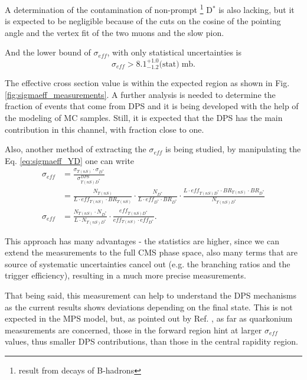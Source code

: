 A determination of the contamination of non-prompt \footnote{result from decays of B-hadrons} D$^*$ is also lacking, but it is expected to be negligible because of the cuts on the cosine of the pointing angle and the vertex fit of the two muons and the slow pion.

And the lower bound of $\sigma_{eff}$, with only statistical uncertainties is
\begin{equation}
  \sigma_{eff} > 8.1^{+1.0}_{-1.2} \text{(stat)} \; \text{mb}.
\end{equation}

The effective cross section value is within the expected region as shown in Fig. \ref{fig:sigmaeff_measurements}. A further analysis is needed to determine the fraction of events that come from DPS and it is being developed with the help of the modeling of MC samples. Still, it is expected that the DPS has the main contribution in this channel, with fraction close to one.

Also, another method of extracting the $\sigma_{eff}$ is being studied, by manipulating the Eq. \ref{eq:sigmaeff_YD} one can write
\begin{equation}
\begin{split}
  \sigma_{eff} &= \frac{\sigma_{\Upsilon(nS)} \cdot \sigma_{D^*}}{\sigma_{\Upsilon(nS) D^*}^{DPS}} \\
  &= \frac{N_{\Upsilon(nS)}}{L \cdot eff_{\Upsilon(nS)} \cdot BR_{\Upsilon(nS)}} \cdot \frac{N_{D^*}}{L \cdot eff_{D^*} \cdot BR_{D^*}} \cdot \frac{L \cdot eff_{\Upsilon(nS) D^*} \cdot BR_{\Upsilon(nS)} \cdot BR_{D^*}}{N_{\Upsilon(nS) D^*}} \\
  \sigma_{eff} &= \frac{N_{\Upsilon(nS)} \cdot N_{D^*}}{L \cdot N_{\Upsilon(nS) D^*}} \cdot \frac{eff_{\Upsilon(nS) D^*}}{eff_{\Upsilon(nS)} \cdot eff_{D^*}}.
\end{split}
\end{equation}

This approach has many advantages - the statistics are higher, since we can extend the measurements to the full CMS phase space, also many terms that are source of systematic uncertainties cancel out (e.g. the branching ratios and the trigger efficiency), resulting in a much more precise measurements.

That being said, this measurement can help to understand the DPS mechanisms as the current results shows deviations depending on the final state. This is not expected in the MPS model, but, as pointed out by Ref. \cite{Lansberg:2019adr}, as far as quarkonium measurements are concerned, those in the forward region hint at larger $\sigma_{eff}$ values, thus smaller DPS contributions, than those in the central rapidity region.
